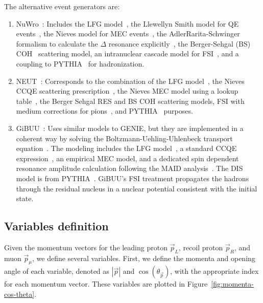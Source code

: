 \documentclass{article}
\newcommand{\vm}{\vec{p}_\mu}
\newcommand{\vlp}{\vec{p}_L}
\newcommand{\vrp}{\vec{p}_R}
\begin{document}
The alternative event generators are:
\begin{enumerate}[label=(\roman*)]
    \item NuWro~\cite{GOLAN2012499}: Includes the LFG model~\cite{CARRASCO1992445}, the Llewellyn Smith model for QE events~\cite{LLEWELLYNSMITH1972261},
    the Nieves model for MEC events~\cite{PhysRevC.83.045501}, the AdlerRarita-Schwinger formalism to calculate the $\Delta$
    resonance explicitly~\cite{PhysRevD.77.053001}, the Berger-Sehgal (BS) COH~\cite{PhysRevD.79.053003} scattering model, an intranuclear cascade
    model for FSI~\cite{PhysRevC.83.045501}, and a coupling to PYTHIA~\cite{Sjostrand_2006} for hadronization.
    \item NEUT~\cite{Hayato2021}: Corresponds to the combination of the LFG model~\cite{Bourguille2021,CARRASCO1992445}, the Nieves CCQE scattering prescription~\cite{PhysRevD.85.113008}, the Nieves MEC model
    using a lookup table~\cite{schwehr2017genieimplementationificvalencia}, the Berger Sehgal RES \cite{PhysRevD.76.113004,PhysRevD.77.053001,Auchincloss1990} and BS COH \cite{PhysRevD.79.053003} scattering models, FSI
    with medium corrections for pions~\cite{ANDREOPOULOS201087,andreopoulos2015genieneutrinomontecarlo}, and PYTHIA~\cite{Sjostrand_2006} purposes.
    \item GiBUU~\cite{Mosel_2019}: Uses similar models to GENIE, but they are implemented in a coherent way
    by solving the Boltzmann-Uehling-Uhlenbeck transport equation~\cite{Mosel_2019}. The modeling includes the LFG model~\cite{CARRASCO1992445}, a standard CCQE expression~\cite{PhysRevC.73.065502}, an
    empirical MEC model, and a dedicated spin dependent resonance amplitude calculation following the MAID analysis~\cite{Mosel_2019}. The DIS model is from PYTHIA~\cite{Sjostrand_2006}. GiBUU’s FSI treatment propagates the hadrons through the residual nucleus in a nuclear potential
    consistent with the initial state.
\end{enumerate}

\subsection{Variables definition}

Given the momentum vectors for the leading proton $\vlp$, recoil proton $\vrp$, and muon $\vm$, we 
define several variables. First, we define the momenta and opening angle of each variable, denoted as $|\vec p|$ and $\cos(\theta_{\vec p})$, with the appropriate index for each momentum vector. These variables are plotted in Figure~\ref{fig:momenta-cos-theta}.
\end{document}
